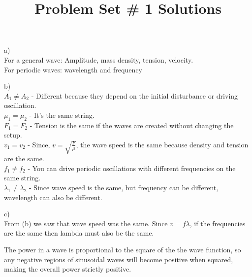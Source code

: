 \documentclass[10pt]{article}
\newenvironment{problem}[2][Problem]{\begin{trivlist}
\item[\hskip \labelsep {\bfseries #1}\hskip \labelsep {\bfseries #2.}]}{\end{trivlist}}
\begin{document}
 \title{Problem Set \# 1 Solutions}
\date{}
\maketitle
 
\begin{problem}{1}
\item
a)\\
For a general wave: Amplitude, mass density, tension, velocity.\\
For periodic waves: wavelength and frequency
\item
b)\\
$A_1 \neq A_2$ - Different because they depend on the initial disturbance or driving oscillation.\\
$\mu_1 = \mu_2$ - It's the same string.\\
$F_1 = F_2$ - Tension is the same if the waves are created without changing the setup.\\
$v_1 = v_2$ - Since, $v = \sqrt{\frac{F}{\mu}}$, the wave speed is the same because density and tension are the same.\\
$f_1 \neq f_2$ - You can drive periodic oscillations with different frequencies on the same string.\\
$\lambda_1 \neq \lambda_2$ - Since wave speed is the same, but frequency can be different, wavelength can also be different.
\item
c)\\
From (b) we saw that wave speed was the same. Since $v = f\lambda$, if the frequencies are the same then lambda must also be the same.
\end{problem}

\begin{problem}{2}
The power in a wave is proportional to the square of the the wave function, so any negative regions of sinusoidal waves will become positive when squared, making the overall power strictly positive.
\end{problem}
\end{document}
